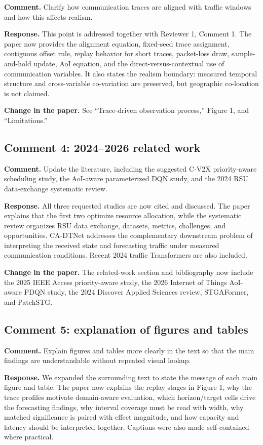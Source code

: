 \documentclass[11pt]{article}
\newcommand{\reviewcomment}[1]{\par\textcolor{commentblue}{\textbf{Comment.} #1}\par}
\newcommand{\authorresponse}[1]{\par\textcolor{responsegreen}{\textbf{Response.} #1}\par}
\newcommand{\paperchange}[1]{\par\textbf{Change in the paper.} #1\par}
\begin{document}
\reviewcomment{Clarify how communication traces are aligned with traffic windows and how this affects realism.}

\authorresponse{This point is addressed together with Reviewer 1, Comment 1. The paper now provides the alignment equation, fixed-seed trace assignment, contiguous offset rule, replay behavior for short traces, packet-loss draw, sample-and-hold update, AoI equation, and the direct-versus-contextual use of communication variables. It also states the realism boundary: measured temporal structure and cross-variable co-variation are preserved, but geographic co-location is not claimed.}

\paperchange{See ``Trace-driven observation process,'' Figure 1, and ``Limitations.''}

\subsection*{Comment 4: 2024--2026 related work}

\reviewcomment{Update the literature, including the suggested C-V2X priority-aware scheduling study, the AoI-aware parameterized DQN study, and the 2024 RSU data-exchange systematic review.}

\authorresponse{All three requested studies are now cited and discussed. The paper explains that the first two optimize resource allocation, while the systematic review organizes RSU data exchange, datasets, metrics, challenges, and opportunities. CA-DTNet addresses the complementary downstream problem of interpreting the received state and forecasting traffic under measured communication conditions. Recent 2024 traffic Transformers are also included.}

\paperchange{The related-work section and bibliography now include the 2025 IEEE Access priority-aware study, the 2026 Internet of Things AoI-aware PDQN study, the 2024 Discover Applied Sciences review, STGAFormer, and PatchSTG.}

\subsection*{Comment 5: explanation of figures and tables}

\reviewcomment{Explain figures and tables more clearly in the text so that the main findings are understandable without repeated visual lookup.}

\authorresponse{We expanded the surrounding text to state the message of each main figure and table. The paper now explains the replay stages in Figure 1, why the trace profiles motivate domain-aware evaluation, which horizon/target cells drive the forecasting findings, why interval coverage must be read with width, why matched significance is paired with effect magnitude, and how capacity and latency should be interpreted together. Captions were also made self-contained where practical.}
\end{document}
